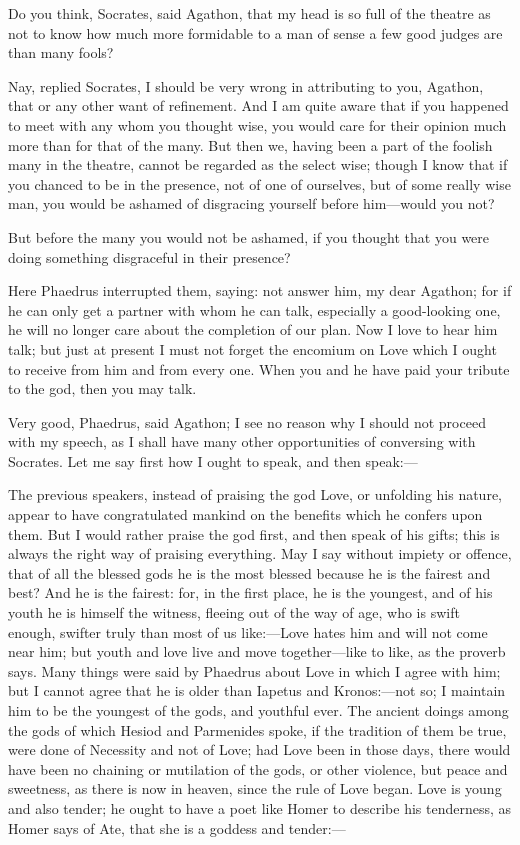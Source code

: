 \para[69] Do you think, Socrates, said Agathon, that my head is so full of the theatre as not to know how much more formidable to a man of sense a few good judges are than many fools?

\para[70] Nay, replied Socrates, I should be very wrong in attributing to you, Agathon, that or any other want of refinement. And I am quite aware that if you happened to meet with any whom you thought wise, you would care for their opinion much more than for that of the many. But then we, having been a part of the foolish many in the theatre, cannot be regarded as the select wise; though I know that if you chanced to be in the presence, not of one of ourselves, but of some really wise man, you would be ashamed of disgracing yourself before him---would you not?

\para[71] But before the many you would not be ashamed, if you thought that you were doing something disgraceful in their presence?

\para[72] Here Phaedrus interrupted them, saying: not answer him, my dear Agathon; for if he can only get a partner with whom he can talk, especially a good-looking one, he will no longer care about the completion of our plan. Now I love to hear him talk; but just at present I must not forget the encomium on Love which I ought to receive from him and from every one. When you and he have paid your tribute to the god, then you may talk.

\para[73] Very good, Phaedrus, said Agathon; I see no reason why I should not proceed with my speech, as I shall have many other opportunities of conversing with Socrates. Let me say first how I ought to speak, and then speak:---

\para[74] The previous speakers, instead of praising the god Love, or unfolding his nature, appear to have congratulated mankind on the benefits which he confers upon them. But I would rather praise the god first, and then speak of his gifts; this is always the right way of praising everything. May I say without impiety or offence, that of all the blessed gods he is the most blessed because he is the fairest and best? And he is the fairest: for, in the first place, he is the youngest, and of his youth he is himself the witness, fleeing out of the way of age, who is swift enough, swifter truly than most of us like:---Love hates him and will not come near him; but youth and love live and move together---like to like, as the proverb says. Many things were said by Phaedrus about Love in which I agree with him; but I cannot agree that he is older than Iapetus and Kronos:---not so; I maintain him to be the youngest of the gods, and youthful ever. The ancient doings among the gods of which Hesiod and Parmenides spoke, if the tradition of them be true, were done of Necessity and not of Love; had Love been in those days, there would have been no chaining or mutilation of the gods, or other violence, but peace and sweetness, as there is now in heaven, since the rule of Love began. Love is young and also tender; he ought to have a poet like Homer to describe his tenderness, as Homer says of Ate, that she is a goddess and tender:---

